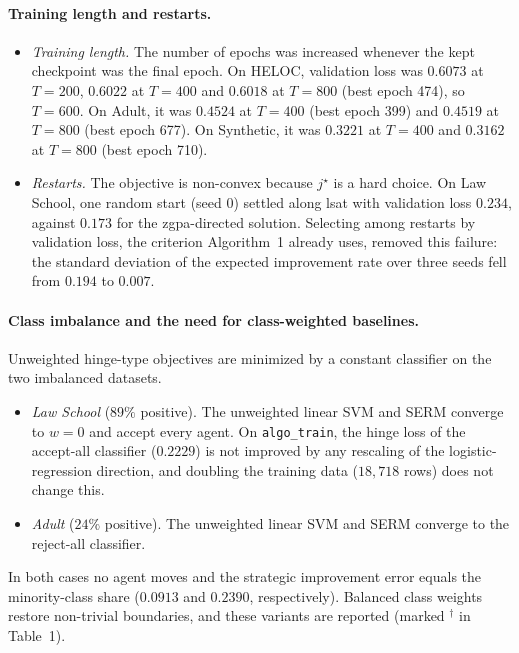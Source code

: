 \paragraph{Training length and restarts.}
\begin{itemize}
  \item \emph{Training length.} The number of epochs was increased whenever
        the kept checkpoint was the final epoch. On HELOC, validation loss was
        $0.6073$ at $T{=}200$, $0.6022$ at $T{=}400$ and $0.6018$ at $T{=}800$
        (best epoch 474), so $T=600$. On Adult, it was $0.4524$ at $T{=}400$
        (best epoch 399) and $0.4519$ at $T{=}800$ (best epoch 677). On
        Synthetic, it was $0.3221$ at $T{=}400$ and $0.3162$ at $T{=}800$ (best
        epoch 710).
  \item \emph{Restarts.} The objective is non-convex because $j^\star$ is a
        hard choice. On Law School, one random start (seed 0) settled along
        lsat with validation loss $0.234$, against $0.173$ for the
        zgpa-directed solution. Selecting among restarts by validation loss, the
        criterion Algorithm~1 already uses, removed this failure: the standard
        deviation of the expected improvement rate over three seeds fell from
        $0.194$ to $0.007$.
\end{itemize}

\paragraph{Class imbalance and the need for class-weighted baselines.}
Unweighted hinge-type objectives are minimized by a constant classifier on the
two imbalanced datasets.
\begin{itemize}
  \item \emph{Law School} ($89\%$ positive). The unweighted linear SVM and
        \textsc{SERM} converge to $w=0$ and accept every agent. On
        \texttt{algo\_train}, the hinge loss of the accept-all classifier
        ($0.2229$) is not improved by any rescaling of the logistic-regression
        direction, and doubling the training data
        ($18{,}718$ rows) does not change this.
  \item \emph{Adult} ($24\%$ positive). The unweighted linear SVM and
        \textsc{SERM} converge to the reject-all classifier.
\end{itemize}
In both cases no agent moves and the strategic improvement error equals the
minority-class share ($0.0913$ and $0.2390$, respectively). Balanced class
weights restore non-trivial boundaries, and these variants are reported (marked
$^\dagger$ in Table~1).

